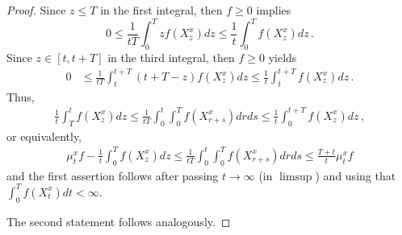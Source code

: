 \documentclass[10pt,a4paper]{amsart}
\begin{document}
\begin{proof}
Since $z \leq T$ in the first integral, then $f \geq 0$  implies
$$
0 \leq \frac{1}{tT} \int_0^T zf(X_z^x)dz \leq 
\frac{1}{t} \int_0^T f(X_z^x)dz \,. 
$$
Since $z \in [t, t+T]$ in the third integral, then $f \geq 0$ yields
\begin{align*}
  0 &\leq \frac{1}{tT} \int_t^{t + T} (t+T-z)f(X_z^x)dz 
 \leq
  \frac{1}{t} \int_t^{t + T} f(X_z^x)dz \,.
\end{align*}
Thus, 
\begin{align*}
  \frac{1}{t}\int_T^t f(X_z^x)dz \leq  \frac{1}{tT}
\int_0^t\int_0^T f(X_{r+s}^x)drds \leq 
\frac{1}{t}\int_0^{t+T} f(X_z^x)dz \,,
\end{align*}
or equivalently, 
\begin{align*}
 \mu_t^xf - \frac{1}{t}\int_0^T f(X_z^x)dz \leq  \frac{1}{tT}
\int_0^t\int_0^T f(X_{r+s}^x)drds \leq 
\frac{T+t}{t} \mu_t^xf 
\end{align*}
and the first assertion follows after passing $t \to \infty$ (in $\limsup$) and using that $\int_0^T f(X_t^x)dt < \infty$. 

The second statement follows analogously. 





\end{proof}
\end{document}
